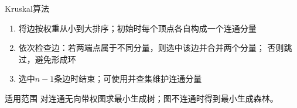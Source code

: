 \begin{frame}
    \frametitle{\insertsectionhead}
    \begin{block}{Kruskal算法}
        \begin{enumerate}
            \item 将边按权重从小到大排序；初始时每个顶点各自构成一个连通分量
            \item 依次检查边：若两端点属于不同分量，则选中该边并合并两个分量；
                  否则跳过，避免形成环
            \item 选中$n-1$条边时结束；可使用并查集维护连通分量
        \end{enumerate}
    \end{block}
    \begin{alertblock}{适用范围}
        对连通无向带权图求最小生成树；图不连通时得到最小生成森林。
    \end{alertblock}
\end{frame}

